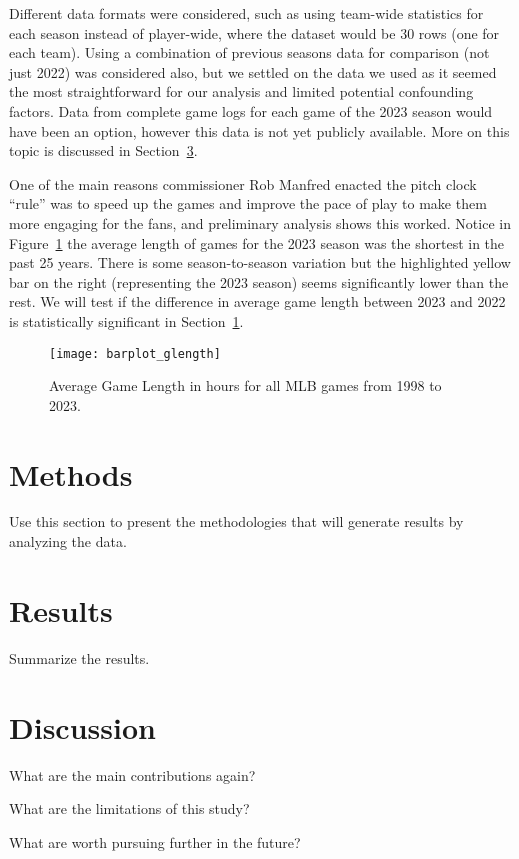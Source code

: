 \documentclass[12pt]{article}
\begin{document}
Different data formats were considered, such as using team-wide statistics
for each season instead of player-wide, where the dataset would be 30 rows (one
for each team). Using a combination of previous seasons data for comparison (not
just 2022) was considered also, but we settled on the data we used as it seemed
the most straightforward for our analysis and limited potential confounding
factors. Data from complete game logs for each game of the 2023 season would have
been an option, however this data is not yet publicly available. More on this topic
is discussed in Section~\ref{sec:disc}.

One of the main reasons commissioner Rob Manfred enacted the pitch clock ``rule''
was to speed up the games and improve the pace of play to make them more engaging
for the fans, and preliminary analysis shows this worked. Notice in Figure~\ref{fig:Fig1}
the average length of games for the 2023 season was the shortest in the past 25 years.
There is some season-to-season variation but the highlighted yellow bar on the right
(representing the 2023 season) seems significantly lower than the rest. We will
test if the difference in average game length between 2023 and 2022 is statistically
significant in Section~\ref{sec:meth}.

\begin{figure}[tbp]
  \centering
  \texttt{[image: barplot\_glength]}
  \caption{Average Game Length in hours for all MLB games from 1998 to 2023.}
  \label{fig:Fig1}
\end{figure}


\section{Methods}
\label{sec:meth}

Use this section to present the methodologies that will generate results by
analyzing the data.


\section{Results}
\label{sec:resu}

Summarize the results.


\section{Discussion}
\label{sec:disc}

What are the main contributions again?

What are the limitations of this study?

What are worth pursuing further in the future?




\end{document}
